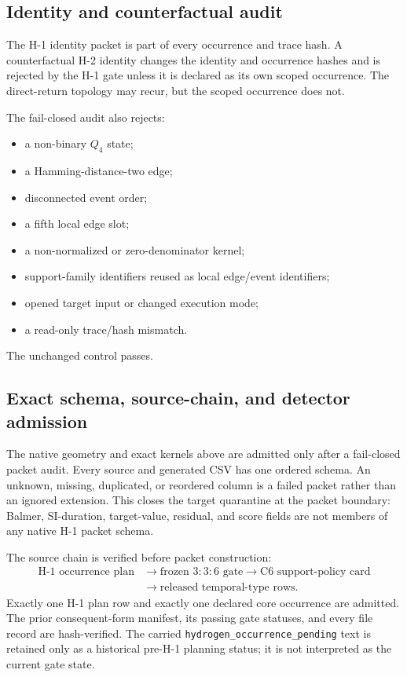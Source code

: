 \subsection{Identity and counterfactual audit}

The H-1 identity packet is part of every occurrence and trace hash.  A
counterfactual H-2 identity changes the identity and occurrence hashes and is
rejected by the H-1 gate unless it is declared as its own scoped occurrence.
The direct-return topology may recur, but the scoped occurrence does not.

The fail-closed audit also rejects:
\begin{itemize}
  \item a non-binary \(Q_4\) state;
  \item a Hamming-distance-two edge;
  \item disconnected event order;
  \item a fifth local edge slot;
  \item a non-normalized or zero-denominator kernel;
  \item support-family identifiers reused as local edge/event identifiers;
  \item opened target input or changed execution mode;
  \item a read-only trace/hash mismatch.
\end{itemize}
The unchanged control passes.


\subsection{Exact schema, source-chain, and detector admission}

The native geometry and exact kernels above are admitted only after a
fail-closed packet audit.  Every source and generated CSV has one ordered
schema.  An unknown, missing, duplicated, or reordered column is a failed
packet rather than an ignored extension.  This closes the target quarantine at
the packet boundary: Balmer, SI-duration, target-value, residual, and score
fields are not members of any native H-1 packet schema.

The source chain is verified before packet construction:
\[
\begin{aligned}
\text{H-1 occurrence plan}
&\to
\text{frozen }3{:}3{:}6\text{ gate}
\to
\text{C6 support-policy card}
\\
&\to
\text{released temporal-type rows}.
\end{aligned}
\]
Exactly one H-1 plan row and exactly one declared core occurrence are admitted.
The prior consequent-form manifest, its passing gate statuses, and every file
record are hash-verified.  The carried
\texttt{hydrogen\_\allowbreak occurrence\_\allowbreak pending} text is retained only as a historical
pre-H-1 planning status; it is not interpreted as the current gate state.

